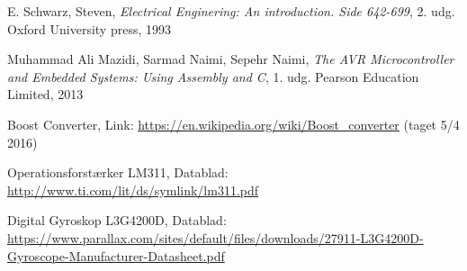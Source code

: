 \begin{thebibliography}{9}

  E. Schwarz, Steven,
  \emph{Electrical Enginering: An introduction. Side 642-699},
  2. udg.
  Oxford University press,
  1993

    Muhammad Ali Mazidi, Sarmad Naimi, Sepehr Naimi,
    \emph{The AVR Microcontroller and Embedded Systems: Using Assembly and C},
    1. udg.
    Pearson Education Limited,
    2013

      Boost Converter, Link:
    \url{https://en.wikipedia.org/wiki/Boost_converter}
      (taget 5/4 2016)


        Operationsforstærker LM311, Datablad:
      \url{http://www.ti.com/lit/ds/symlink/lm311.pdf}


        Digital Gyroskop L3G4200D, Datablad:
      \url{https://www.parallax.com/sites/default/files/downloads/27911-L3G4200D-Gyroscope-Manufacturer-Datasheet.pdf}



\end{thebibliography}
